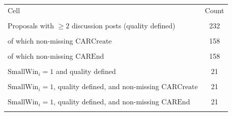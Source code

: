 \begin{tabular}{lc}
\toprule
Cell & Count \\\\
\midrule
Proposals with $\geq 2$ discussion posts (quality defined) & 232 \\\\
\quad of which non-missing $\mathrm{CARCreate}$ & 158 \\\\
\quad of which non-missing $\mathrm{CAREnd}$ & 158 \\\\
$\mathrm{SmallWin}_i=1$ and quality defined & 21 \\\\
$\mathrm{SmallWin}_i=1$, quality defined, and non-missing $\mathrm{CARCreate}$ & 21 \\\\
$\mathrm{SmallWin}_i=1$, quality defined, and non-missing $\mathrm{CAREnd}$ & 21 \\\\
\bottomrule
\end{tabular}
